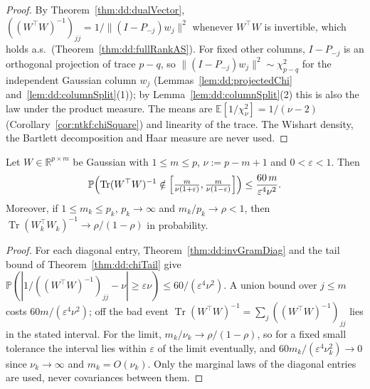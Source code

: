 \begin{proof}
  \leanok
By Theorem~\ref{thm:dd:dualVector}, $((W^\top W)^{-1})_{jj}=1/\|(I-P_{-j})w_j\|^2$ whenever $W^\top W$ is invertible, which holds a.s.\ (Theorem~\ref{thm:dd:fullRankAS}).
For fixed other columns, $I-P_{-j}$ is an orthogonal projection of trace $p-q$, so $\|(I-P_{-j})w_j\|^2\sim\chi^2_{p-q}$ for the independent Gaussian column $w_j$
(Lemmas~\ref{lem:dd:projectedChi} and~\ref{lem:dd:columnSplit}(1)); by Lemma~\ref{lem:dd:columnSplit}(2) this is also the law under the product measure. The means are
$\mathbb E[1/\chi^2_\nu]=1/(\nu-2)$ (Corollary~\ref{cor:ntkf:chiSquare}) and linearity of the trace. The Wishart density, the Bartlett decomposition and Haar measure are never used.
\end{proof}

\begin{theorem}\label{thm:dd:traceConcentration}
  \leanok
Let $W\in\mathbb R^{p\times m}$ be Gaussian with $1\le m\le p$, $\nu:=p-m+1$ and $0<\varepsilon<1$. Then
\[
  \mathbb P\Bigl(\operatorname{Tr}(W^\top W)^{-1}\notin\Bigl[\tfrac m{\nu(1+\varepsilon)},\tfrac m{\nu(1-\varepsilon)}\Bigr]\Bigr)\le\frac{60\,m}{\varepsilon^4\nu^2}.
\]
Moreover, if $1\le m_k\le p_k$, $p_k\to\infty$ and $m_k/p_k\to\rho<1$, then $\operatorname{Tr}(W_k^\top W_k)^{-1}\to\rho/(1-\rho)$ in probability.
\end{theorem}

\begin{proof}
  \leanok
For each diagonal entry, Theorem~\ref{thm:dd:invGramDiag} and the tail bound of Theorem~\ref{thm:dd:chiTail} give
$\mathbb P(|1/((W^\top W)^{-1})_{jj}-\nu|\ge\varepsilon\nu)\le60/(\varepsilon^4\nu^2)$. A union bound over $j\le m$ costs $60m/(\varepsilon^4\nu^2)$; off the bad event
$\operatorname{Tr}(W^\top W)^{-1}=\sum_j((W^\top W)^{-1})_{jj}$ lies in the stated interval. For the limit, $m_k/\nu_k\to\rho/(1-\rho)$, so for a fixed small tolerance the interval lies within $\varepsilon$ of the limit
eventually, and $60m_k/(\varepsilon^4\nu_k^2)\to0$ since $\nu_k\to\infty$ and $m_k=O(\nu_k)$. Only the marginal laws of the diagonal entries are used, never covariances between them.
\end{proof}

